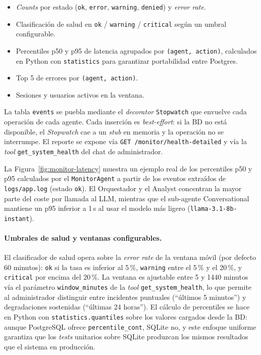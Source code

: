\begin{itemize}[leftmargin=1.5em,itemsep=0.2em]
  \item \textit{Counts} por estado (\texttt{ok}, \texttt{error},
        \texttt{warning}, \texttt{denied}) y \textit{error rate}.
  \item Clasificación de salud en \texttt{ok} / \texttt{warning} /
        \texttt{critical} según un umbral configurable.
  \item Percentiles p50 y p95 de latencia agrupados por
        \texttt{(agent, action)}, calculados en Python con
        \texttt{statistics} para garantizar portabilidad entre
        Postgres.
  \item Top 5 de errores por \texttt{(agent, action)}.
  \item Sesiones y usuarios activos en la ventana.
\end{itemize}

La tabla \texttt{events} se puebla mediante el \textit{decorator}
\texttt{Stopwatch} que envuelve cada operación de cada agente. Cada
inserción es \textit{best-effort}: si la BD no está disponible, el
\textit{Stopwatch} cae a un \textit{stub} en memoria y la operación
no se interrumpe. El reporte se expone vía
\texttt{GET /monitor/health-detailed} y vía la \textit{tool}
\texttt{get\_system\_health} del chat de administrador.

La Figura~\ref{fig:monitor-latency} muestra un ejemplo real de los
percentiles p50 y p95 calculados por el \texttt{MonitorAgent} a partir
de los eventos extraídos de \texttt{logs/app.log} (estado \texttt{ok}).
El Orquestador y el Analyst concentran la mayor parte del coste por
llamada al LLM, mientras que el sub-agente Conversational mantiene un
p95 inferior a 1\,s al usar el modelo más ligero
(\texttt{llama-3.1-8b-instant}).

\paragraph{Umbrales de salud y ventanas configurables.} El clasificador
de salud opera sobre la \textit{error rate} de la ventana móvil
(por defecto 60 minutos): \texttt{ok} si la tasa es inferior al
5\,\%, \texttt{warning} entre el 5\,\% y el 20\,\%, y \texttt{critical}
por encima del 20\,\%. La ventana es ajustable entre 5 y 1440 minutos
vía el parámetro \texttt{window\_minutes} de la \textit{tool}
\texttt{get\_system\_health}, lo que permite al administrador
distinguir entre incidentes puntuales (``últimos 5 minutos'') y
degradaciones sostenidas (``últimas 24 horas''). El cálculo de
percentiles se hace en Python con \texttt{statistics.quantiles}
sobre los valores cargados desde la BD: aunque PostgreSQL ofrece
\texttt{percentile\_cont}, SQLite no, y este enfoque uniforme
garantiza que los \textit{tests} unitarios sobre SQLite produzcan los
mismos resultados que el sistema en producción.

